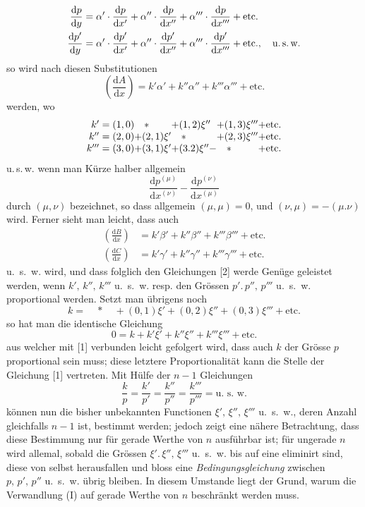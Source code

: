 \[
\begin{aligned}
\frac{\mathrm{d}p}{\mathrm{d}y}&=\alpha'\cdot\frac{\mathrm{d}p}{\mathrm{d}x'}
+\alpha''\cdot\frac{\mathrm{d}p}{\mathrm{d}x''}
+\alpha'''\cdot\frac{\mathrm{d}p}{\mathrm{d}x'''}+\text{etc.}\\
\frac{\mathrm{d}p'}{\mathrm{d}y}&=\alpha'\cdot\frac{\mathrm{d}p'}{\mathrm{d}x'}
+\alpha''\cdot\frac{\mathrm{d}p'}{\mathrm{d}x''}
+\alpha'''\cdot\frac{\mathrm{d}p'}{\mathrm{d}x'''}+\text{etc.},\quad\text{u.\,s.\,w.}
\end{aligned}
\]
so wird nach diesen Substitutionen
\[
\left(\frac{\mathrm{d}A}{\mathrm{d}x}\right)=k'\alpha'+k''\alpha''+k'''\alpha'''+\text{etc.}
\]
werden, wo
\[
\begin{array}{r@{}l@{}l@{}l@{}l@{}l}
k'={}&(1,0)&\quad *\quad&+(1,2)\xi''&+(1,3)\xi'''&+\text{etc.}\\
k''={}&(2,0)&+(2,1)\xi'&\quad *\quad&+(2,3)\xi'''&+\text{etc.}\\
k'''={}&(3,0)&+(3,1)\xi'&+(3.2)\xi''-&\quad *\quad&+\text{etc.}
\end{array}
\]
u.\,s.\,w. wenn man Kürze halber allgemein
\[
\frac{\mathrm{d}p^{(\mu)}}{\mathrm{d}x^{(\nu)}}
-\frac{\mathrm{d}p^{(\nu)}}{\mathrm{d}x^{(\mu)}}
\]
durch $(\mu,\nu)$ bezeichnet, so dass allgemein $(\mu,\mu)=0$, und $(\nu,\mu)=-(\mu.\nu)$ wird.
Ferner sieht man leicht, dass auch
\[
\begin{aligned}
\left(\frac{\mathrm{d}B}{\mathrm{d}x}\right)&=k'\beta'+k''\beta''+k'''\beta'''+\text{etc.}\\
\left(\frac{\mathrm{d}C}{\mathrm{d}x}\right)&=k'\gamma'+k''\gamma''+k'''\gamma'''+\text{etc.}
\end{aligned}
\]
u.\ s.\ w. wird, und dass folglich den Gleichungen [2] werde Genüge geleistet werden, wenn \(k',\,k'',\,k'''\) u.\ s.\ w. resp. den Grössen \(p'.\,p'',\,p'''\) u.\ s.\ w. proportional werden. Setzt man übrigens noch
\[
k=\quad *\quad +(0,1)\xi'+(0,2)\xi''+(0,3)\xi'''+\text{etc.}
\]
so hat man die identische Gleichung
\[
0=k+k'\xi'+k''\xi''+k'''\xi'''+\text{etc.}
\]
aus welcher mit [1] verbunden leicht gefolgert wird, dass auch \(k\) der Grösse \(p\) proportional sein muss; diese letztere Proportionalität kann die Stelle der Gleichung [1] vertreten. Mit Hülfe der \(n-1\) Gleichungen
\[
\frac{k}{p}=\frac{k'}{p'}=\frac{k''}{p''}=\frac{k'''}{p'''}=\text{u.\ s.\ w.}
\]
können nun die bisher unbekannten Functionen \(\xi',\,\xi'',\,\xi'''\) u.\ s.\ w., deren Anzahl gleichfalls \(n-1\) ist, bestimmt werden; jedoch zeigt eine nähere Betrachtung, dass diese Bestimmung nur für gerade Werthe von \(n\) ausführbar ist; für ungerade \(n\) wird allemal, sobald die Grössen \(\xi'.\,\xi'',\,\xi'''\) u.\ s.\ w. bis auf eine eliminirt sind, diese von selbst herausfallen und bloss eine \emph{Bedingungsgleichung} zwischen \(p,\,p',\,p''\) u.\ s.\ w. übrig bleiben. In diesem Umstande liegt der Grund, warum die Verwandlung (I) auf gerade Werthe von \(n\) beschränkt werden muss.

